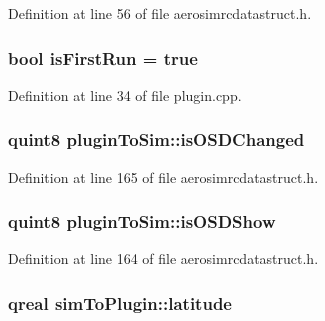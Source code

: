Definition at line 56 of file aerosimrcdatastruct.\-h.

\hypertarget{group___aero_sim_r_c_gae612ff4fcd9d86f5ce097c2583d2bfee}{
\subsubsection[{is\-First\-Run}]{\setlength{\rightskip}{0pt plus 5cm}bool is\-First\-Run = true}}\label{group___aero_sim_r_c_gae612ff4fcd9d86f5ce097c2583d2bfee}


Definition at line 34 of file plugin.\-cpp.

\hypertarget{group___aero_sim_r_c_gaa416deb314c63406b7320311d1cf71d7}{
\subsubsection[{is\-O\-S\-D\-Changed}]{\setlength{\rightskip}{0pt plus 5cm}quint8 plugin\-To\-Sim\-::is\-O\-S\-D\-Changed}}\label{group___aero_sim_r_c_gaa416deb314c63406b7320311d1cf71d7}


Definition at line 165 of file aerosimrcdatastruct.\-h.

\hypertarget{group___aero_sim_r_c_ga35a2acc4730f500b87b19630f57c14ed}{
\subsubsection[{is\-O\-S\-D\-Show}]{\setlength{\rightskip}{0pt plus 5cm}quint8 plugin\-To\-Sim\-::is\-O\-S\-D\-Show}}\label{group___aero_sim_r_c_ga35a2acc4730f500b87b19630f57c14ed}


Definition at line 164 of file aerosimrcdatastruct.\-h.

\hypertarget{group___aero_sim_r_c_ga53209d2be245073a24064614cb7c2ce2}{
\subsubsection[{latitude}]{\setlength{\rightskip}{0pt plus 5cm}qreal sim\-To\-Plugin\-::latitude}}\label{group___aero_sim_r_c_ga53209d2be245073a24064614cb7c2ce2}


